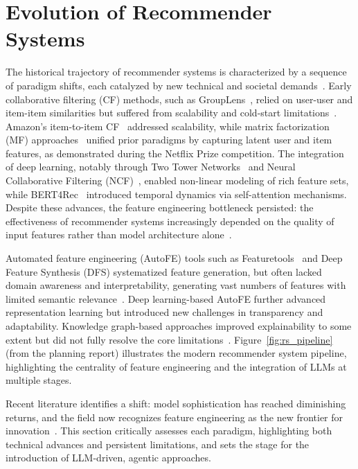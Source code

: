 \section{Evolution of Recommender Systems}
The historical trajectory of recommender systems is characterized by a sequence of paradigm shifts, each catalyzed by new technical and societal demands~\cite{litterature_review,Planning_Report}. Early collaborative filtering (CF) methods, such as GroupLens~\cite{Resnick1994GroupLens}, relied on user-user and item-item similarities but suffered from scalability and cold-start limitations~\cite{Planning_Report}. Amazon's item-to-item CF~\cite{Linden2003Amazon} addressed scalability, while matrix factorization (MF) approaches~\cite{Koren2009MatrixFactorization} unified prior paradigms by capturing latent user and item features, as demonstrated during the Netflix Prize competition. The integration of deep learning, notably through Two Tower Networks~\cite{Cheng2016WideDeep} and Neural Collaborative Filtering (NCF)~\cite{He2017NCF}, enabled non-linear modeling of rich feature sets, while BERT4Rec~\cite{Sun2019BERT4Rec} introduced temporal dynamics via self-attention mechanisms. Despite these advances, the feature engineering bottleneck persisted: the effectiveness of recommender systems increasingly depended on the quality of input features rather than model architecture alone~\cite{Kanter2015Featuretools,litterature_review}.

Automated feature engineering (AutoFE) tools such as Featuretools~\cite{Kanter2015Featuretools} and Deep Feature Synthesis (DFS) systematized feature generation, but often lacked domain awareness and interpretability, generating vast numbers of features with limited semantic relevance~\cite{litterature_review}. Deep learning-based AutoFE further advanced representation learning but introduced new challenges in transparency and adaptability. Knowledge graph-based approaches improved explainability to some extent but did not fully resolve the core limitations~\cite{Planning_Report}. Figure~\ref{fig:rs_pipeline} (from the planning report) illustrates the modern recommender system pipeline, highlighting the centrality of feature engineering and the integration of LLMs at multiple stages.

Recent literature identifies a shift: model sophistication has reached diminishing returns, and the field now recognizes feature engineering as the new frontier for innovation~\cite{litterature_review}. This section critically assesses each paradigm, highlighting both technical advances and persistent limitations, and sets the stage for the introduction of LLM-driven, agentic approaches.

